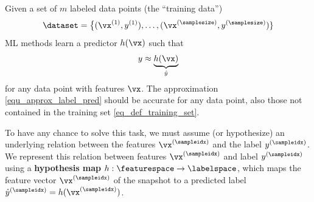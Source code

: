 \documentclass[12pt]{report}
\begin{document}
Given a set of $m$ labeled data points (the ``training data'')
\begin{equation} 
\label{eq_def_training_set}
\dataset  = \big\{ (\vx^{(1)},y^{(1)}), \ldots, (\vx^{(\samplesize)},y^{(\samplesize)}) \}
\end{equation}
ML methods learn a predictor $h(\vx)$ such that 
\begin{equation} 
\label{equ_approx_label_pred}
y \approx \underbrace{h(\vx)}_{\hat{y}}
\end{equation}  
for any data point with features $\vx$. The approximation \eqref{equ_approx_label_pred} 
should be accurate for any data point, also those not contained 
in the training set \eqref{eq_def_training_set}. 


To have any chance to solve this task, we must assume (or hypothesize) 
an underlying relation between the features $\vx^{(\sampleidx)}$ 
and the label $y^{(\sampleidx)}$. We represent this relation between 
features $\vx^{(\sampleidx)}$ and label $y^{(\sampleidx)}$ using a 
{\bf hypothesis map} $h: \featurespace \rightarrow \labelspace$, which 
maps the feature vector $\vx^{(\sampleidx)}$ of the snapshot to a 
predicted label $\hat{y}^{(\sampleidx)} = h(\vx^{(\sampleidx)})$. 

\end{document}
